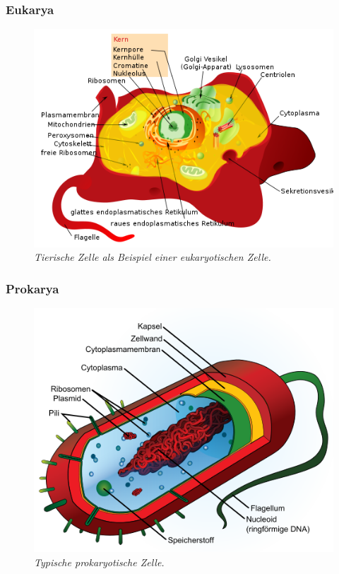\subsubsection{Eukarya}
\begin{figure}[ht!]
	\leavevmode
	\begin{center}
		\includegraphics[scale=0.47]{./pictures/animal_cell_500}
	\end{center}
	\caption{\slshape{Tierische Zelle als Beispiel einer eukaryotischen Zelle.}}
	\label{fig:eukarya}
\end{figure}

\subsubsection{Prokarya}
\begin{figure}[ht!]
	\leavevmode
	\begin{center}
		\includegraphics[scale=0.47]{./pictures/avg_prokaryote_cell_500}
	\end{center}
	\caption{\slshape{Typische prokaryotische Zelle.}}
	\label{fig:prokarya}
\end{figure}

